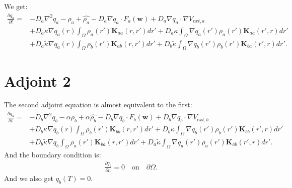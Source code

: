 \documentclass[11pt, a4paper]{article}
\theoremstyle{definition}
\newcommand{\adja}{q_a}
\newcommand{\adjb}{q_b}
\newcommand{\ra}{\rho_a}
\newcommand{\rb}{\rho_b}
\newcommand{\w}{\mathbf{w}}
\newcommand{\K}{\mathbf{K}}
\begin{document}
	We get:
	\begin{align*}
	 \frac{\partial \adja}{\partial t} = &- D_a\nabla^2\adja - \ra + \widehat{\ra}    - D_a\nabla \adja \cdot F_a(\w) + D_a \nabla \adja \cdot  \nabla V_{ext,a} \\
	 &+ D_a\kappa \nabla \adja(r) \int_\Omega \ra (r') \K_{aa}(r,r')dr' + D_a\kappa \int_\Omega \nabla \adja(r') \ra (r') \K_{aa}(r',r)dr' \\
	 & + D_a \tilde{\kappa} \nabla \adja(r) \int_\Omega  \rb (r') \K_{ab} (r,r')dr' + D_b \tilde \kappa\int_\Omega \nabla \adjb(r') \rb (r') \K_{ba}(r',r)dr' .
	\end{align*}
	\section{Adjoint 2}
	The second adjoint equation is almost equivalent to the first:
	\begin{align*}
	\frac{\partial \adjb}{\partial t} = &- D_b\nabla^2\adjb - \alpha \rb + \alpha \widehat{\rb}    - D_b\nabla \adjb \cdot F_b(\w) + D_b \nabla \adjb \cdot  \nabla V_{ext,b} \\
	&+ D_b\kappa \nabla \adjb(r) \int_\Omega \rb (r') \K_{bb}(r,r')dr' + D_b\kappa \int_\Omega \nabla \adjb(r') \rb (r') \K_{bb}(r',r)dr' \\
	& + D_b \tilde{\kappa} \nabla \adjb \int_\Omega  \ra (r') \K_{ba} (r,r')dr' + D_a \tilde \kappa\int_\Omega \nabla \adja(r') \ra (r') \K_{ab}(r',r)dr'.
	\end{align*}
	And the boundary condition is:
	\begin{align*}
	\frac{\partial \adjb}{\partial n} = 0 \quad \text{on} \quad \partial \Omega.
	\end{align*} 
	And we also get $\adjb(T) = 0$.
	
\end{document}
